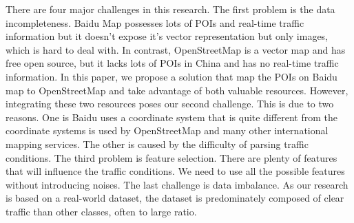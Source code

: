 There are four major challenges in this research. 
The first problem is the data incompleteness. 
Baidu Map possesses lots of POIs and real-time traffic information but 
it doesn't expose it's vector representation but only images, which 
is hard to deal with. In contrast, OpenStreetMap is a vector map 
and has free open source, but it lacks lots of POIs in China and 
has no real-time traffic information. In this paper, we propose
a solution that map the POIs on Baidu map to OpenStreetMap and take advantage
of both valuable resources. However, integrating these two resources poses
our second challenge. This is due to two reasons. 
One is Baidu uses a coordinate system that is quite different from the 
coordinate systems is used by OpenStreetMap and many other international mapping
services. The other is caused by the difficulty of parsing traffic conditions. 
The third problem is feature selection. There are plenty of features 
that will influence the traffic conditions. We need to use all the 
possible features without introducing noises. The last challenge
is data imbalance. As our research is based on a 
real-world dataset, the dataset is predominately composed
of clear traffic than other classes, often to large ratio.

